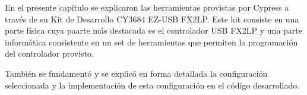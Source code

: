 En el presente capítulo se explicaron las herramientas provistas por Cypress a través de su Kit de Desarrollo CY3684 EZ-USB FX2LP. Este kit consiste en una parte física cuya paarte más destacada es el controlador USB FX2LP y una parte informática consistente en un set de herramientas que permiten la programación del controlador provisto.

También se fundamentó y se explicó en forma detallada la configuración seleccionada y la implementación de esta configuración en el código desarrollado.